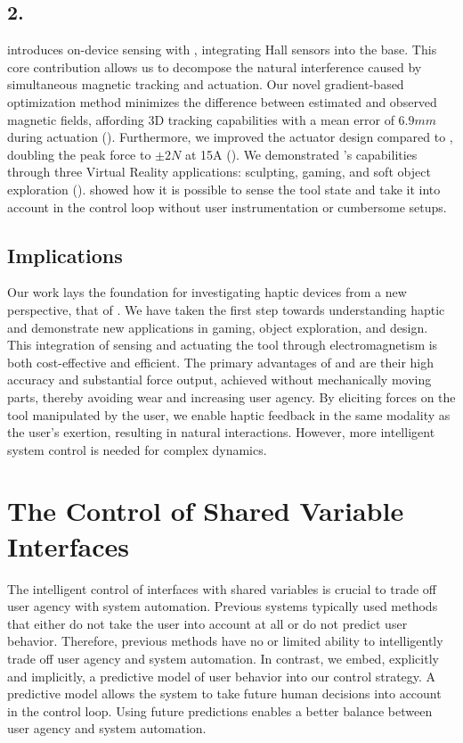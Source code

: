 \subsection*{2. \omniUISTTitle}
 introduces on-device sensing with \omniUIST, integrating Hall sensors into the \omniHap base. This core contribution allows us to decompose the natural interference caused by simultaneous magnetic tracking and actuation. Our novel gradient-based optimization method minimizes the difference between estimated and observed magnetic fields, affording 3D tracking capabilities with a mean error of $6.9mm$ during actuation (). Furthermore, we improved the actuator design compared to \omniHap, doubling the peak force to $\pm 2N$ at 15A (). We demonstrated \omniUIST's capabilities through three Virtual Reality applications: sculpting, gaming, and soft object exploration (). \omniUIST showed how it is possible to sense the tool state and take it into account in the control loop without user instrumentation or cumbersome setups.

\subsection*{Implications}
Our work lays the foundation for investigating haptic devices from a new perspective, that of \interfacesLower. We have taken the first step towards understanding haptic \interfacesLower and demonstrate new applications in gaming, object exploration, and design. This integration of sensing and actuating the tool through electromagnetism is both cost-effective and efficient. The primary advantages of \omniHap and \omniUIST are their high accuracy and substantial force output, achieved without mechanically moving parts, thereby avoiding wear and increasing user agency. By eliciting forces on the tool manipulated by the user, we enable haptic feedback in the same modality as the user's exertion, resulting in natural interactions. However, more intelligent system control is needed for complex dynamics.

\section*{The Control of Shared Variable Interfaces}
The intelligent control of interfaces with shared variables is crucial to trade off user agency with system automation. Previous systems typically used methods that either do not take the user into account at all or do not predict user behavior. Therefore, previous methods have no or limited ability to intelligently trade off user agency and system automation. In contrast, we embed, explicitly and implicitly, a predictive model of user behavior into our control strategy. A predictive model allows the system to take future human decisions into account in the control loop. Using future predictions enables a better balance between user agency and system automation.

